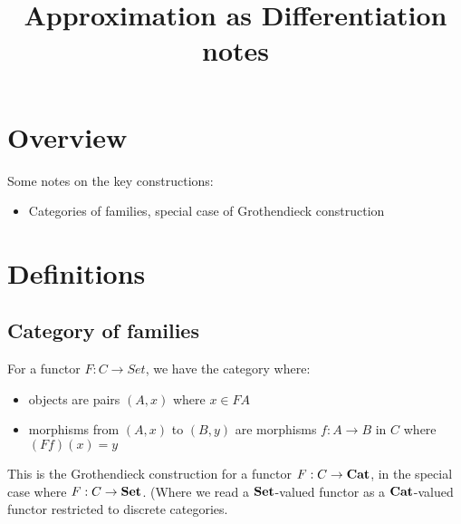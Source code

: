 \documentclass{acmart}
\begin{document}
\title{Approximation as Differentiation notes}
\maketitle

\section{Overview}

Some notes on the key constructions:
\begin{itemize}
\item Categories of families, special case of Grothendieck construction
\end{itemize}

\section{Definitions}

\subsection{Category of families}

For a functor $F: C \to Set$, we have the category where:
\begin{itemize}
\item objects are pairs $(A, x)$ where $x \in FA$
\item morphisms from $(A, x)$ to $(B, y)$ are morphisms $f: A \to B$ in $C$ where $(Ff)(x) = y$
\end{itemize}

\noindent This is the Grothendieck construction for a functor $F: C \to \mathbf{Cat}$, in the special case where $F: C
\to \mathbf{Set}$. (Where we read a $\mathbf{Set}$-valued functor as a $\mathbf{Cat}$-valued functor restricted to discrete
categories.
\end{document}
